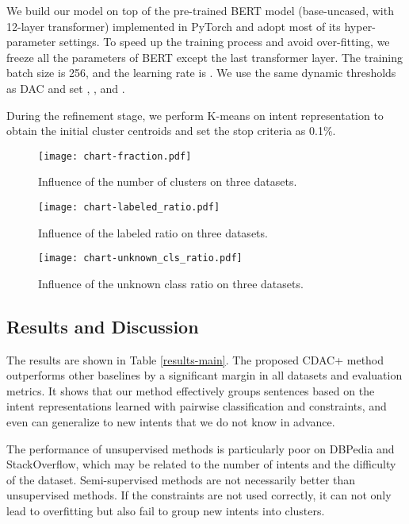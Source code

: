 \documentclass[letterpaper]{article} \usepackage{aaai20}  \usepackage{times}  \usepackage{helvet} \usepackage{courier}  \usepackage[hyphens]{url}  \usepackage{graphicx} \urlstyle{rm} \def\UrlFont{\rm}  \usepackage{graphicx}  \frenchspacing  \setlength{\pdfpagewidth}{8.5in}  \setlength{\pdfpageheight}{11in}
\begin{document}
We build our model on top of the pre-trained BERT model (base-uncased, with 12-layer transformer) implemented in PyTorch \cite{Wolf2019HuggingFacesTS} and adopt most of its hyper-parameter settings. To speed up the training process and avoid over-fitting, we freeze all the parameters of BERT except the last transformer layer. The training batch size is 256, and the learning rate is . We use the same dynamic thresholds as DAC \cite{chang2017deep} and set , , and .

During the refinement stage, we perform K-means on intent representation  to obtain the initial cluster centroids  and set the stop criteria  as 0.1\%.

\begin{figure*}[!t]
  \centering  
  \texttt{[image: chart-fraction.pdf]}
  \caption{\label{fraction} Influence of the number of clusters on three datasets.}
\end{figure*}

\begin{figure*}[!t]
  \centering  
  \texttt{[image: chart-labeled\_ratio.pdf]}
  \caption{\label{labeled} Influence of the labeled ratio on three datasets.}
\end{figure*}

\begin{figure*}[!t]
  \centering  
  \texttt{[image: chart-unknown\_cls\_ratio.pdf]}
  \caption{\label{unknown} Influence of the unknown class ratio on three datasets.}
\end{figure*}

\subsection{Results and Discussion}
The results are shown in Table \ref{results-main}. The proposed CDAC+ method outperforms other baselines by a significant margin in all datasets and evaluation metrics. It shows that our method effectively groups sentences based on the intent representations learned with pairwise classification and constraints, and even can generalize to new intents that we do not know in advance. 

The performance of unsupervised methods is particularly poor on DBPedia and StackOverflow, which may be related to the number of intents and the difficulty of the dataset. Semi-supervised methods are not necessarily better than unsupervised methods. If the constraints are not used correctly, it can not only lead to overfitting but also fail to group new intents into clusters. 
\end{document}
